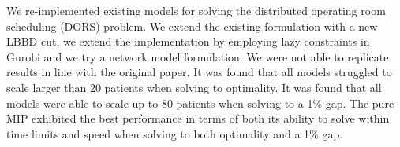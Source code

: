 We re-implemented existing models\cite{roshanaei2017propagating} for solving the distributed operating room scheduling (DORS) problem. We extend the existing formulation with a new LBBD cut, we extend the implementation by employing lazy constraints in Gurobi and we try a network model formulation. We were not able to replicate results in line with the original paper. It was found that all models struggled to scale larger than 20 patients when solving to optimality. It was found that all models were able to scale up to 80 patients when solving to a 1\% gap. The pure MIP exhibited the best performance in terms of both its ability to solve within time limits and speed when solving to both optimality and a 1\% gap. 